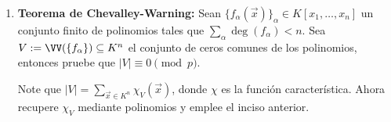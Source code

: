 \documentclass[11pt, reqno]{amsart}
\begin{document}
\begin{enumerate}
\begin{enumerate}
			\item \textbf{Teorema de Chevalley-Warning:}
				\lookright
				Sean $\{ f_\alpha(\vec x) \}_\alpha \in K[x_1, \dots, x_n]$ un conjunto finito de polinomios tales que $\sum_{\alpha} \deg(f_\alpha) < n$.
				Sea $V := \VV(\{ f_\alpha \}) \subseteq K^n$ el conjunto de ceros comunes de los polinomios, entonces pruebe que $|V| \equiv 0 \pmod p$.

				\begin{hint}
					Note que $|V| = \sum_{\vec x \in K^n} \chi_V(\vec x)$, donde $\chi$ es la función característica.
					Ahora recupere $\chi_V$ mediante polinomios y emplee el inciso anterior.
				\end{hint}
		\end{enumerate}
		\nocite{granville:masterclass, serre:arithmetic}
\end{enumerate}



\printbibliography[title={Referencias y lecturas adicionales}]
\end{document}
